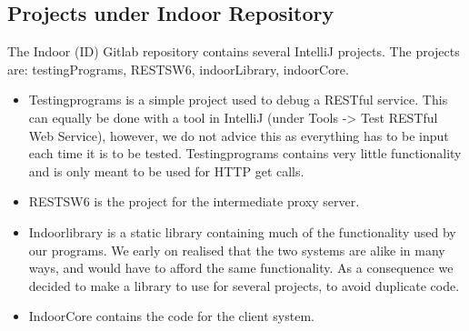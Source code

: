 \subsection*{Projects under Indoor Repository}
The Indoor (ID) Gitlab repository contains several IntelliJ projects. The projects are: testingPrograms, RESTSW6, indoorLibrary, indoorCore.

\begin{itemize}
\item Testingprograms is a simple project used to debug a RESTful service. This can equally be done with a tool in IntelliJ (under Tools -> Test RESTful Web Service), however, we do not advice this as everything has to be input each time it is to be tested. Testingprograms contains very little functionality and is only meant to be used for HTTP get calls.
\item RESTSW6 is the project for the intermediate proxy server. 
\item Indoorlibrary is a static library containing much of the functionality used by our programs. We early on realised that the two systems are alike in many ways, and would have to afford the same functionality. As a consequence we decided to make a library to use for several projects, to avoid duplicate code. 
\item IndoorCore contains the code for the client system. 
\end{itemize} 



